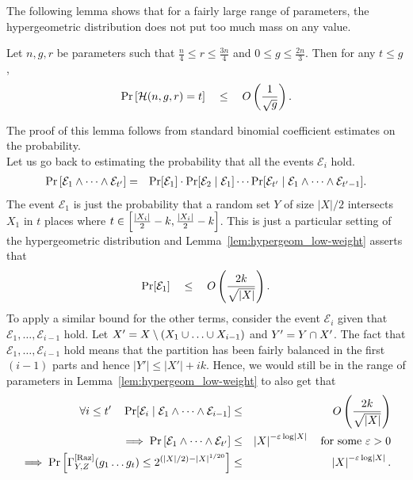 The following lemma shows that for a fairly large range of parameters, the hypergeometric distribution does not put too much mass on any value.

\begin{lemma}\label{lem:hypergeom_low-weight}
  Let $n,g,r$ be parameters such that $\frac{n}{4} \leq r \leq \frac{3n}{4}$ and $0\leq g\leq \frac{2n}{3}$. Then for any $t\leq g$,
  $$
  \Pr\left[\mathcal{H}(n,g,r) = t\right] \quad \leq \quad O\left(\frac{1}{\sqrt{g}}\right).
  $$
\end{lemma}
The proof of this lemma follows from standard binomial coefficient estimates on the probability.\\

Let us go back to estimating the probability that all the events $\mathcal{E}_i$ hold.
\begin{eqnarray*}
  \Pr\left[\mathcal{E}_1 \wedge \dots \wedge \mathcal{E}_{t'}\right] & = & \Pr[\mathcal{E}_1] \cdot \Pr[\mathcal{E}_2 \mid \mathcal{E}_1] \cdots \Pr[\mathcal{E}_{t'}\mid \mathcal{E}_1 \wedge \dots \wedge \mathcal{E}_{t'-1}].
\end{eqnarray*}
The event $\mathcal{E}_1$ is just the probability that a random set $Y$ of size $|X|/2$ intersects $X_1$ in $t$ places where $t \in \left[\frac{|X_i|}{2} -k , \frac{|X_i|}{2} -k\right]$. This is just a particular setting of the hypergeometric distribution and Lemma~\ref{lem:hypergeom_low-weight} asserts that
$$
\Pr[\mathcal{E}_1] \quad \leq \quad O\left(\frac{2k}{\sqrt{|X|}}\right).
$$
To apply a similar bound for the other terms, consider the event $\mathcal{E}_i$ given that $\mathcal{E}_1, \dots, \mathcal{E}_{i-1}$ hold. Let $X' = X \setminus (X_1 \union \dots \union X_{i-1})$ and $Y' = Y\cap X'$. The fact that $\mathcal{E}_1,\dots, \mathcal{E}_{i-1}$ hold means that the partition has been fairly balanced in the first $(i-1)$ parts and hence $|Y'| \leq |X'| + ik$. Hence, we would still be in the range of parameters in Lemma~\ref{lem:hypergeom_low-weight} to also get that
\begin{eqnarray*}
  \forall i\leq t'\quad \Pr[\mathcal{E}_i\mid \mathcal{E}_1 \wedge \cdots \wedge \mathcal{E}_{i-1}] &\leq& O\left(\frac{2k}{\sqrt{|X|}}\right)\\
  \implies \Pr\left[\mathcal{E}_1\wedge \dots \wedge \mathcal{E}_{t'}\right] & \leq & \left|X\right|^{-\varepsilon \log \left|X\right|} \quad\text{for some $\varepsilon > 0$}  \\
  \implies \Pr\left[\Gamma^{\mathrm{[Raz]}}_{Y,Z}(g_1\dots g_t) \leq 2^{(|X|/2) - |X|^{1/20}}\right] & \leq & \left|X\right|^{-\varepsilon \log \left|X\right|}.
\end{eqnarray*}

